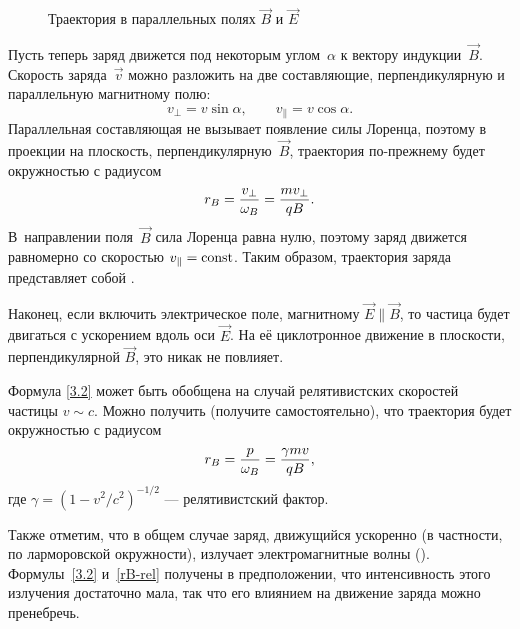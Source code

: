 \begin{wrapfigure}{o}{0.25\textwidth}
\centering
 \caption{Траектория в параллельных полях $\vec{B}$ и $\vec{E}$}
\end{wrapfigure}

Пусть теперь заряд движется под некоторым углом~$\alpha$ к вектору
индукции~$\vec{B}$. Скорость заряда~$\vec{v}$ можно разложить
на две составляющие, перпендикулярную и параллельную магнитному полю:
\begin{equation*}
    v_{\perp}=v\sin\alpha,\qquad v_{\parallel}=v\cos\alpha.
\end{equation*}
Параллельная составляющая не вызывает появление силы Лоренца, поэтому
в проекции на плоскость, перпендикулярную~$\vec{B}$,
траектория по-прежнему будет окружностью с радиусом
\begin{equation}
    \eqmark{3.4}
    r_B = \frac{v_{\perp}}{\omega_B} = \frac{m v_{\perp}}{qB}.
\end{equation}
В~направлении поля~$\vec{B}$ сила Лоренца равна нулю, поэтому заряд движется
равномерно со скоростью $v_{\parallel}=\mathrm{const}$.
Таким образом, траектория заряда представляет собой .

Наконец, если включить электрическое поле, 
магнитному $\vec{E}\parallel\vec{B}$, то частица будет двигаться с ускорением
вдоль оси $\vec{E}$. На её циклотронное движение в плоскости, перпендикулярной
$\vec{B}$, это никак не повлияет.

\begin{lab:note}
Формула \eqref{3.2} может быть обобщена на случай релятивистских скоростей
частицы $v\sim c$. Можно получить (получите самостоятельно),
что траектория будет окружностью с радиусом
\begin{equation}
\eqmark{rB-rel}
    r_B = \frac{p}{\omega_B} =
    \frac{\gamma m v}{qB},
\end{equation}
где $\gamma = (1-v^2/c^2)^{-1/2}$ --- релятивистский фактор.

Также отметим, что в общем случае заряд, движущийся ускоренно (в частности,
по ларморовской окружности), излучает электромагнитные волны
(). Формулы~\eqref{3.2} и~\eqref{rB-rel} получены в
предположении, что интенсивность этого излучения достаточно мала,
так что его влиянием на движение заряда можно пренебречь.
\end{lab:note}



